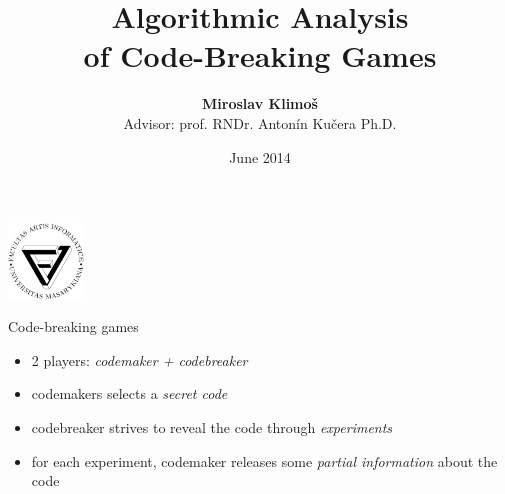 \documentclass{beamer}
\title{Algorithmic Analysis\\ of Code-Breaking Games}
\author{\textbf{Miroslav Klimoš} \\\medskip Advisor: prof. RNDr. Antonín Kučera Ph.D.}
\date{June 2014}
\begin{document}
\begin{frame}[plain]
\begin{center}
\includegraphics[width=20mm]{logo_fi.pdf}
\end{center}
\vspace{-5mm}
\maketitle
\end{frame}

\begin{frame}{Code-breaking games}
\begin{itemize}
\item 2 players: \emph{codemaker + codebreaker}
\item codemakers selects a \emph{secret code}
\item codebreaker strives to reveal the code through \emph{experiments}
\item for each experiment, codemaker releases some \emph{partial information} about the code
\end{itemize}
\end{frame}
\end{document}
